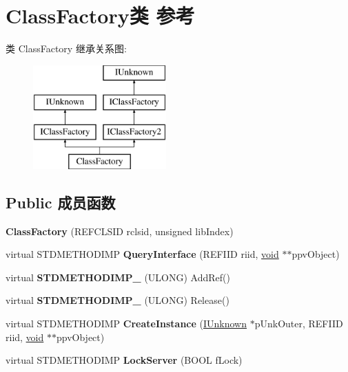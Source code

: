 \hypertarget{struct_class_factory}{}\section{Class\+Factory类 参考}
\label{struct_class_factory}
类 Class\+Factory 继承关系图\+:\begin{figure}[H]
\begin{center}
\leavevmode
\includegraphics[height=4.000000cm]{struct_class_factory}
\end{center}
\end{figure}
\subsection*{Public 成员函数}
\begin{DoxyCompactItemize}
\item 
\mbox{\label{struct_class_factory_a6353b18a26baa84c441e823560ef68c5}} 
{\bfseries Class\+Factory} (R\+E\+F\+C\+L\+S\+ID rclsid, unsigned lib\+Index)
\item 
\mbox{\label{struct_class_factory_a57316f5ac276fdf485fb33900fb9f950}} 
virtual S\+T\+D\+M\+E\+T\+H\+O\+D\+I\+MP {\bfseries Query\+Interface} (R\+E\+F\+I\+ID riid, \hyperlink{interfacevoid}{void} $\ast$$\ast$ppv\+Object)
\item 
\mbox{\label{struct_class_factory_ab7f296d00d3ecb006ee65920c13f2946}} 
virtual {\bfseries S\+T\+D\+M\+E\+T\+H\+O\+D\+I\+M\+P\+\_\+} (U\+L\+O\+NG) Add\+Ref()
\item 
\mbox{\label{struct_class_factory_a01708dc7a3af4b37299819490a6a6e1b}} 
virtual {\bfseries S\+T\+D\+M\+E\+T\+H\+O\+D\+I\+M\+P\+\_\+} (U\+L\+O\+NG) Release()
\item 
\mbox{\label{struct_class_factory_a36d4668cedaac7de96e3929aa73c64ff}} 
virtual S\+T\+D\+M\+E\+T\+H\+O\+D\+I\+MP {\bfseries Create\+Instance} (\hyperlink{interface_i_unknown}{I\+Unknown} $\ast$p\+Unk\+Outer, R\+E\+F\+I\+ID riid, \hyperlink{interfacevoid}{void} $\ast$$\ast$ppv\+Object)
\item 
\mbox{\label{struct_class_factory_a41107192649ba9db2ff50dfab751e7c6}} 
virtual S\+T\+D\+M\+E\+T\+H\+O\+D\+I\+MP {\bfseries Lock\+Server} (B\+O\+OL f\+Lock)
\end{DoxyCompactItemize}
